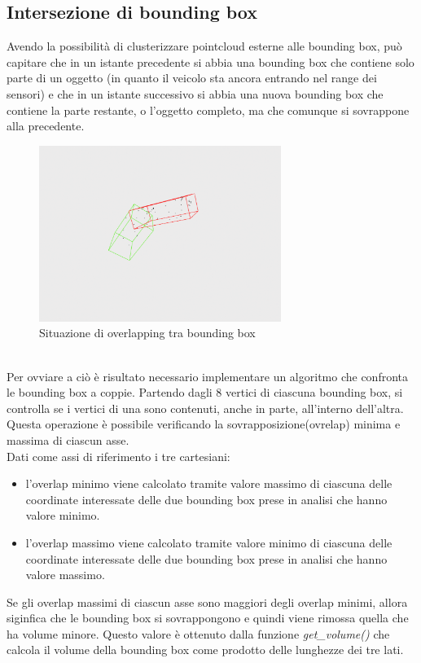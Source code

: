 \documentclass[italian]{article}
\begin{document}
\subsection{Intersezione di bounding box}
Avendo la possibilità di clusterizzare pointcloud esterne alle bounding box, può capitare che in un istante precedente si abbia una bounding box che contiene solo parte di un oggetto (in quanto il veicolo sta ancora entrando nel range dei sensori) e che in un istante successivo si abbia una nuova bounding box che contiene la parte restante, o l'oggetto completo, ma che comunque si sovrappone alla precedente.\\
\begin{figure}[H]
	\centering
	\includegraphics[width=0.7\textwidth]{Overlapping}
	\footnotesize
	\caption{Situazione di overlapping tra bounding box}
\end{figure}\\
Per ovviare a ciò è risultato necessario implementare un algoritmo che confronta le bounding box a coppie. Partendo dagli 8 vertici di ciascuna bounding box, si controlla se i vertici di una sono contenuti, anche in parte, all'interno dell'altra. Questa operazione è possibile verificando la sovrapposizione(ovrelap) minima e massima di ciascun asse.\\
Dati come assi di riferimento i tre cartesiani:
\begin{itemize}
	\item l'overlap minimo viene calcolato tramite valore massimo di ciascuna delle coordinate interessate delle due bounding box prese in analisi che hanno valore minimo.
	\item l'overlap massimo viene calcolato tramite valore minimo di ciascuna delle coordinate interessate delle due bounding box prese in analisi che hanno valore massimo.
\end{itemize}
Se gli overlap massimi di ciascun asse sono maggiori degli overlap minimi, allora siginfica che le bounding box si sovrappongono e quindi viene rimossa quella che ha volume minore. Questo valore è ottenuto dalla funzione \textit{get\_volume()} che calcola il volume della bounding box come prodotto delle lunghezze dei tre lati.\\
\end{document}
